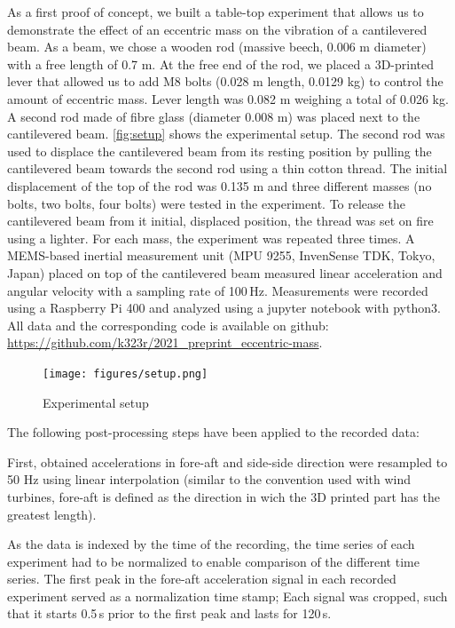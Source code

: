 \documentclass{article}
\begin{document}
As a first proof of concept, we built a table-top experiment that allows us to demonstrate the effect of an eccentric mass on the vibration of a cantilevered beam. As a beam, we chose a wooden rod (massive beech, 0.006 m diameter) with a free length of 0.7 m. At the free end of the rod, we placed a 3D-printed lever that allowed us to add M8 bolts (0.028 m length, 0.0129 kg) to control the amount of eccentric mass. Lever length was 0.082 m weighing a total of 0.026 kg. A second rod made of fibre glass (diameter 0.008 m) was placed next to the cantilevered beam. \autoref{fig:setup} shows the experimental setup. The second rod was used to displace the cantilevered beam from its resting position  by pulling the cantilevered beam towards the second rod using a thin cotton thread. The initial displacement of the top of the rod was 0.135 m and three different masses (no bolts, two bolts, four bolts) were tested in the experiment. To release the cantilevered beam from it initial, displaced position, the thread was set on fire using a lighter. For each mass, the experiment was repeated three times. A MEMS-based inertial measurement unit (MPU 9255, InvenSense TDK, Tokyo, Japan) placed on top of the cantilevered beam measured linear acceleration and angular velocity with a sampling rate of 100\,Hz. Measurements were recorded using a Raspberry Pi 400 and analyzed using a jupyter notebook with python3. All data and the corresponding code is available on github: \url{https://github.com/k323r/2021_preprint_eccentric-mass}.

\begin{figure}[ht!]
    \centering
    \texttt{[image: figures/setup.png]}
    \caption{Experimental setup}
    \label{fig:setup}
\end{figure}

The following post-processing steps have been applied to the recorded data:

First, obtained accelerations in fore-aft and side-side direction were resampled to 50 Hz using linear interpolation (similar to the convention used with wind turbines, fore-aft is defined as the direction in wich the 3D printed part has the greatest length). 

As the data is indexed by the time of the recording, the time series of each experiment had to be normalized to enable comparison of the different time series. The first peak in the fore-aft acceleration signal in each recorded experiment served as a normalization time stamp; Each signal was cropped, such that it starts 0.5\,s prior to the first peak and lasts for 120\,s. 
\end{document}

